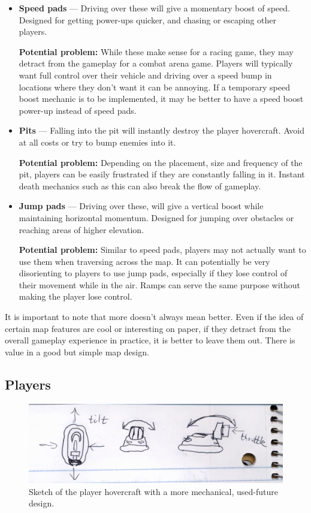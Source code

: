 \documentclass{article}
\theoremstyle{definition}
\begin{document}
\begin{itemize}
  \item \textbf{Speed pads} --- Driving over these will give a momentary boost of
    speed. Designed for getting power-ups quicker, and chasing or escaping
    other players.

    \textbf{Potential problem:} While these make sense for a racing game, they
    may detract from the gameplay for a combat arena game. Players will
    typically want full control over their vehicle and driving over a speed
    bump in locations where they don't want it can be annoying. If a temporary
    speed boost mechanic is to be implemented, it may be better to have a speed
    boost power-up instead of speed pads.
  \item \textbf{Pits} --- Falling into the pit will instantly destroy the player
    hovercraft. Avoid at all costs or try to bump enemies into it.

    \textbf{Potential problem:} Depending on the placement, size and frequency
    of the pit, players can be easily frustrated if they are constantly
    falling in it. Instant death mechanics such as this can also break the flow
    of gameplay.
  \item \textbf{Jump pads} --- Driving over these, will give a vertical boost
    while maintaining horizontal momentum. Designed for jumping over obstacles
    or reaching areas of higher elevation.

    \textbf{Potential problem:} Similar to speed pads, players may not
    actually want to use them when traversing across the map. It can
    potentially be very disorienting to players to use jump pads, especially if
    they lose control of their movement while in the air. Ramps can serve the
    same purpose without making the player lose control.
\end{itemize}

It is important to note that more doesn't always mean better. Even if the idea
of certain map features are cool or interesting on paper, if they detract from
the overall gameplay experience in practice, it is better to leave them out.
There is value in a good but simple map design.

\subsection{Players}

\begin{figure}[htpb]
  \centering
  \includegraphics[width=0.8\linewidth]{Brainstorming_003.png}
  \caption{Sketch of the player hovercraft with a more mechanical, used-future
  design.}
\label{fig:Brainstorming_003}
\end{figure}
\end{document}
